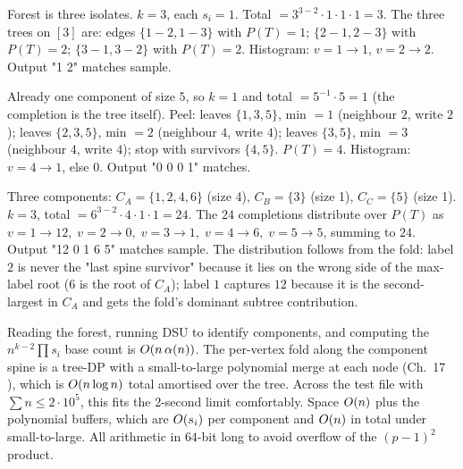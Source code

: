 \begin{tracebox}[Sample case 1: \, \(n=3\), \(m=0\)]
Forest is three isolates.  \(k=3\), each \(s_i=1\).  Total \(=3^{3-2}\cdot
1\cdot 1\cdot 1 = 3\).  The three trees on \([3]\) are: edges
\(\{1\!-\!2, 1\!-\!3\}\) with \(P(T)=1\); \(\{2\!-\!1, 2\!-\!3\}\) with
\(P(T)=2\); \(\{3\!-\!1, 3\!-\!2\}\) with \(P(T)=2\).  Histogram: \(v=1\to
1\), \(v=2\to 2\).  Output "1 2" matches sample.
\end{tracebox}
\begin{tracebox}[Sample case 2: \, \(n=5\), \(m=4\), given tree \(T=\{4\!-\!2,\, 3\!-\!4,\, 1\!-\!2,\, 4\!-\!5\}\)]
Already one component of size \(5\), so \(k=1\) and total \(=5^{-1}\cdot 5
= 1\) (the completion is the tree itself).  Peel: leaves \(\{1,3,5\}\),
min \(=1\) (neighbour \(2\), write \(2\)); leaves \(\{2,3,5\}\), min \(=2\)
(neighbour \(4\), write \(4\)); leaves \(\{3,5\}\), min \(=3\) (neighbour
\(4\), write \(4\)); stop with survivors \(\{4,5\}\).  \(P(T)=4\).
Histogram: \(v=4\to 1\), else \(0\).  Output "0 0 0 1" matches.
\end{tracebox}
\begin{tracebox}[Sample case 3: \, \(n=6\), \(m=3\), forest \(F=\{1\!-\!6,\, 6\!-\!4,\, 2\!-\!1\}\)]
Three components: \(C_A=\{1,2,4,6\}\) (size 4), \(C_B=\{3\}\) (size 1),
\(C_C=\{5\}\) (size 1).  \(k=3\), total \(=6^{3-2}\cdot 4\cdot 1\cdot 1=24\).
The \(24\) completions distribute over \(P(T)\) as \(v=1\to 12,\; v=2\to 0,
\; v=3\to 1, \; v=4\to 6, \; v=5\to 5\), summing to \(24\).  Output "12 0 1
6 5" matches sample.  The distribution follows from the fold: label \(2\) is
never the "last spine survivor" because it lies on the wrong side of the
max-label root (\(6\) is the root of \(C_A\)); label \(1\) captures \(12\)
because it is the second-largest in \(C_A\) and gets the fold's dominant
subtree contribution.
\end{tracebox}

\begin{complexitybox}
Reading the forest, running DSU to identify components, and computing the
\(n^{k-2}\prod s_i\) base count is \(O(n\,\alpha(n))\).  The per-vertex
fold along the component spine is a tree-DP with a small-to-large polynomial
merge at each node (Ch.~17 ), which is \(O(n\log n)\) total
amortised over the tree.  Across the test file with \(\sum n\le 2\cdot
10^5\), this fits the 2-second limit comfortably.  Space \(O(n)\) plus
the polynomial buffers, which are \(O(s_i)\) per component and
\(O(n)\) in total under small-to-large.  All arithmetic in \(64\)-bit
long to avoid overflow of the \((p-1)^2\) product.
\end{complexitybox}

